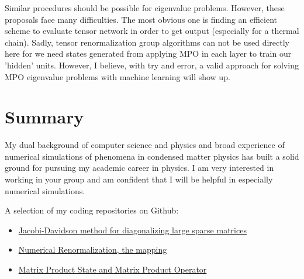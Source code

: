 \documentclass[a4paper]{article}
\newcommand{\<}{\langle}
\renewcommand{\>}{\rangle}
\begin{document}
Similar procedures should be possible for eigenvalue problems.\cite{Yu2015}
However, these proposals face many difficulties.
The most obvious one is finding an efficient scheme to evaluate tensor network in order to get output (especially for a thermal chain).
Sadly, tensor renormalization group algorithms can not be used directly here for we need states generated from applying MPO in each layer to train our 'hidden' units.
However, I believe, with try and error, a valid approach for solving MPO eigenvalue problems with machine learning will show up.

\section{Summary}

My dual background of computer science and physics and broad experience of numerical simulations of phenomena in condensed matter physics has built a solid ground for pursuing my academic career in physics.
I am very interested in working in your group and am confident that I will be helpful in especially numerical simulations.

%


\bigskip
[14] A selection of my coding repositories on Github:
\begin{itemize}
    \item \href{https://github.com/GiggleLiu/Jacobi\_Davidson}{Jacobi-Davidson method for diagonalizing large sparse matrices}
    \item \href{https://github.com/GiggleLiu/nrg\_mapping}{Numerical Renormalization, the mapping}
    \item \href{https://github.com/GiggleLiu/pymps}{Matrix Product State and Matrix Product Operator}
\end{itemize}
\end{document}
